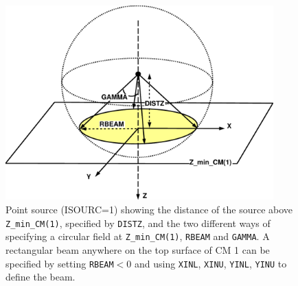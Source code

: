 \documentclass[12pt,twoside]{article}
\begin{document}
\begin{figure}[h]
\vspace*{-0.3cm}
\begin{center}
\leavevmode
\mbox{}\hspace{0cm}
\includegraphics[height=7.5cm]{figures/src1}
\vspace*{-0.5cm}
\caption[ISOURC=1: Point isotropic source on Z-axis.]
{Point source (ISOURC=1) showing the distance of the source above
{\tt Z\_min\_CM(1)}, specified by {\tt DISTZ}, and the two different ways of
specifying a circular field at {\tt Z\_min\_CM(1)}, {\tt RBEAM}
and {\tt GAMMA}.  A rectangular
beam anywhere on the top surface of CM 1
can be specified by setting {\tt RBEAM}$<$0 and
using {\tt XINL}, {\tt XINU}, {\tt YINL}, {\tt YINU} to define the beam.}
\label{fig_src1}
\end{center}
\end{figure}

\clearpage
\end{document}
